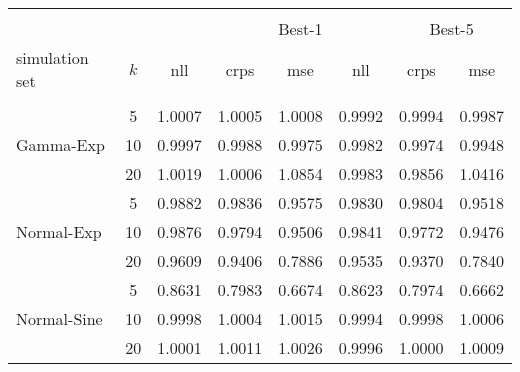 \begin{table}[ht]
\centering
\begin{tabular}{lccccccc}
\hline  \\[-1em]
& & &\multicolumn{3}{c}{Best-1} & \multicolumn{3}{c}{Best-5} \\[0.1em]
simulation set & $k$ & nll & crps & mse & nll & crps & mse \\[0.1em]
  \hline\hline \\[-0.8em]
          &5      & 1.0007 & 1.0005 & 1.0008 & 0.9992 & 0.9994 & 0.9987 \\
Gamma-Exp &10     & 0.9997 & 0.9988 & 0.9975 & 0.9982 & 0.9974 & 0.9948 \\ 
           &20    & 1.0019 & 1.0006 & 1.0854 & 0.9983 & 0.9856 & 1.0416 \\
           &5     & 0.9882 & 0.9836 & 0.9575 & 0.9830 & 0.9804 & 0.9518 \\ 
Normal-Exp &10    & 0.9876 & 0.9794 & 0.9506 & 0.9841 & 0.9772 & 0.9476 \\ 
           &20    & 0.9609 & 0.9406 & 0.7886 & 0.9535 & 0.9370 & 0.7840 \\
           &5     & 0.8631 & 0.7983 & 0.6674 & 0.8623 & 0.7974 & 0.6662 \\  
Normal-Sine &10   & 0.9998 & 1.0004 & 1.0015 & 0.9994 & 0.9998 & 1.0006 \\ 
             &20  & 1.0001 & 1.0011 & 1.0026 & 0.9996 & 1.0000 & 1.0009 \\ 
   \hline
\end{tabular}
\end{table}
